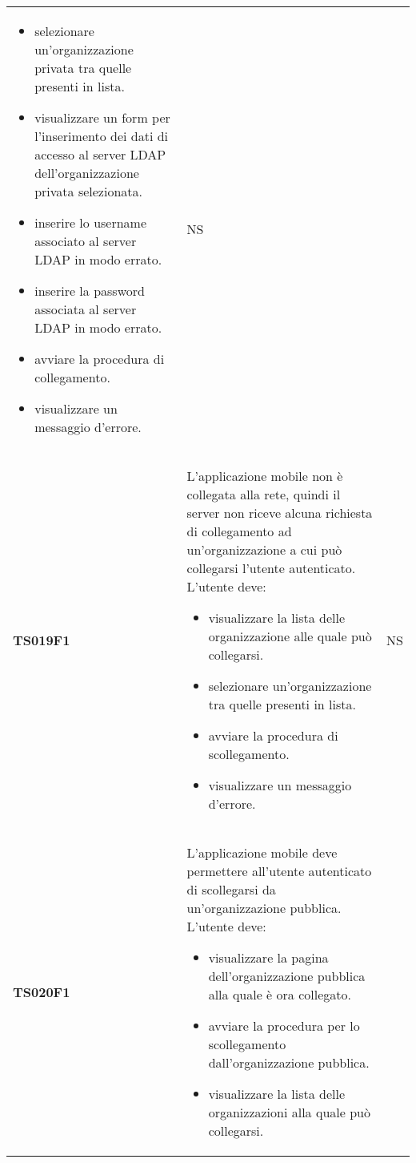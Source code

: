 \documentclass[../piano-di-qualifica.tex]{subfiles}
\begin{document}
\begin{centering}
\begin{longtable}[H]{>{\centering\bfseries}m{3cm} >{}p{10cm} >{\centering\arraybackslash}m{3cm}}
\begin{itemize}
                        \item selezionare un'organizzazione privata tra quelle presenti in lista.
                        \item visualizzare un form per l'inserimento dei dati di accesso al server LDAP dell'organizzazione privata selezionata.
                        \item inserire lo username associato al server LDAP in modo errato.
                        \item inserire la password associata al server LDAP in modo errato.
                        \item avviare la procedura di collegamento.
                        \item visualizzare un messaggio d'errore.
                      \end{itemize}
                    & NS \\
        TS019F1     & L'applicazione mobile non è collegata alla rete, quindi il server non riceve alcuna richiesta di collegamento ad un'organizzazione a cui può collegarsi l'utente autenticato. \newline
                    L'utente deve:
                    \begin{itemize}
                      \item visualizzare la lista delle organizzazione alle quale può collegarsi.
                      \item selezionare un'organizzazione tra quelle presenti in lista.
                      \item avviare la procedura di scollegamento.
                      \item visualizzare un messaggio d'errore.
                    \end{itemize}
                    & NS \\
        TS020F1     & L'applicazione mobile deve permettere all'utente autenticato di scollegarsi da un'organizzazione pubblica. \newline
                      L'utente deve:
                      \begin{itemize}
                        \item visualizzare la pagina dell'organizzazione pubblica alla quale è ora collegato.
                        \item avviare la procedura per lo scollegamento dall'organizzazione pubblica.
                        \item visualizzare la lista delle organizzazioni alla quale può collegarsi.

\end{itemize}
\end{longtable}
\end{centering}
\end{document}
